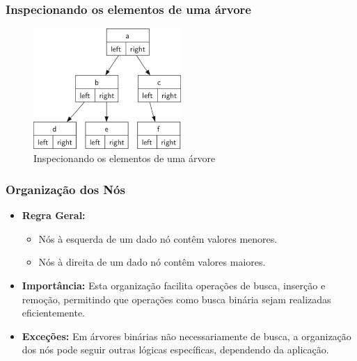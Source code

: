 \begin{frame}[fragile]
  \frametitle{Inspecionando os elementos de uma árvore}
  \begin{figure}
    \centering
    \includegraphics[width=0.5\textwidth]{assets/aula5-arvores2.png}
    \caption{Inspecionando os elementos de uma árvore}
  \end{figure}
\end{frame}
\begin{frame}[fragile]
  \frametitle{Organização dos Nós}
  \begin{itemize}
    \item \textbf{Regra Geral:}
      \begin{itemize}
        \item Nós à esquerda de um dado nó contêm valores menores.
        \item Nós à direita de um dado nó contêm valores maiores.
      \end{itemize}
    \item \textbf{Importância:} Esta organização facilita operações de busca, inserção e remoção, permitindo que operações como busca binária sejam realizadas eficientemente.
    \item \textbf{Exceções:} Em árvores binárias não necessariamente de busca, a organização dos nós pode seguir outras lógicas específicas, dependendo da aplicação.
  \end{itemize}
\end{frame}


